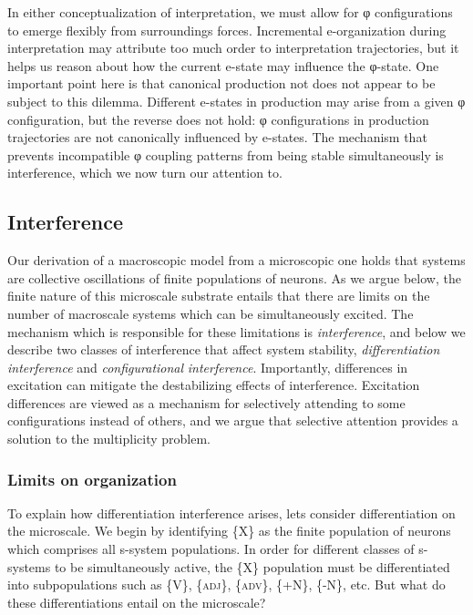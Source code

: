   In either conceptualization of interpretation, we must allow for φ configurations to emerge flexibly from surroundings forces. Incremental e-organization during interpretation may attribute too much order to interpretation trajectories, but it helps us reason about how the current e-state may influence the φ-state. One important point here is that canonical production not does not appear to be subject to this dilemma. Different e-states in production may arise from a given φ configuration, but the reverse does not hold: φ configurations in production trajectories are not canonically influenced by e-states. The mechanism that prevents incompatible φ coupling patterns from being stable simultaneously is interference, which we now turn our attention to.

\subsection{Interference}

Our derivation of a macroscopic model from a microscopic one holds that systems are collective oscillations of finite populations of neurons. As we argue below, the finite nature of this microscale substrate entails that there are limits on the number of macroscale systems which can be simultaneously excited. The mechanism which is responsible for these limitations is \textit{interference}, and below we describe two classes of interference that affect system stability, \textit{differentiation} \textit{interference} and \textit{configurational} \textit{interference}. Importantly, differences in excitation can mitigate the destabilizing effects of interference. Excitation differences are viewed as a mechanism for selectively attending to some configurations instead of others, and we argue that selective attention provides a solution to the multiplicity problem.

\subsubsection{Limits on organization}

To explain how differentiation interference arises, lets consider differentiation on the microscale. We begin by identifying \{X\} as the finite population of neurons which comprises all s-system populations. In order for different classes of s-systems to be simultaneously active, the \{X\} population must be differentiated into subpopulations such as \{V\}, \{\textsc{adj}\}, \{\textsc{adv}\}, \{+N\}, \{-N\}, etc. But what do these differentiations entail on the microscale?

